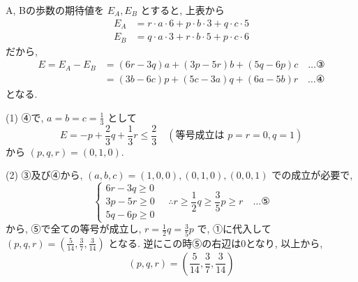 \documentclass[../main.tex]{subfiles}
\begin{document}
\bigskip

A, Bの歩数の期待値を $E_A, E_B$ とすると, 上表から
\begin{align*}
  E_A &= r \cdot a \cdot 6 + p \cdot b \cdot 3 + q \cdot c \cdot 5 \\
  E_B &= q \cdot a \cdot 3 + r \cdot b \cdot 5 + p \cdot c \cdot 6
\end{align*}
だから,
\begin{align*}
  E = E_A - E_B &= (6r - 3q) a + (3p - 5r) b + (5q - 6p) c \quad \dots \text{③} \\
  &= (3b - 6c) p + (5c - 3a) q + (6a - 5b) r \quad \dots \text{④}
\end{align*}
となる.

\bigskip

(1) ④で, $a = b = c = \frac{1}{3}$ として
\[
  E = -p + \frac{2}{3} q + \frac{1}{3} r \le \frac{2}{3} \quad (\text{等号成立は } p=r=0, q=1)
\]
から $(p, q, r) = (0, 1, 0)$.

\bigskip

(2) ③及び④から, $(a,b,c) = (1,0,0), (0,1,0), (0,0,1)$ での成立が必要で,
\[
  \begin{cases} 6r - 3q \ge 0 \\ 3p - 5r \ge 0 \\ 5q - 6p \ge 0
  \end{cases} \quad \therefore r \ge \frac{1}{2} q \ge \frac{3}{5} p \ge r \quad \dots \text{⑤}
\]
から, ⑤で全ての等号が成立し, $r = \frac{1}{2} q = \frac{3}{5} p$ で, ①に代入して $(p, q, r) = \left( \frac{5}{14}, \frac{3}{7}, \frac{3}{14} \right)$ となる. 逆にこの時⑤の右辺は0となり, 以上から,
\[
  (p, q, r) = \left( \frac{5}{14}, \frac{3}{7}, \frac{3}{14} \right)
\]
\end{document}
